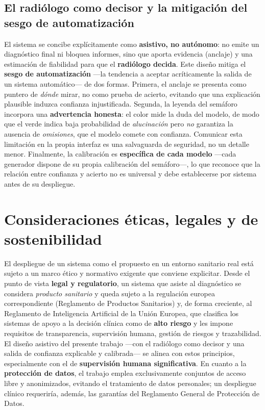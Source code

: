 \subsection{El radiólogo como decisor y la mitigación del sesgo de automatización}
El sistema se concibe explícitamente como \textbf{asistivo, no autónomo}: no emite un diagnóstico
final ni bloquea informes, sino que aporta evidencia (anclaje) y una estimación de fiabilidad para que
el \textbf{radiólogo decida}. Este diseño mitiga el \textbf{sesgo de automatización} —la tendencia a
aceptar acríticamente la salida de un sistema automático— de dos formas. Primera, el anclaje se
presenta como puntero de \emph{dónde} mirar, no como prueba de acierto, evitando que una explicación
plausible induzca confianza injustificada. Segunda, la leyenda del semáforo incorpora una
\textbf{advertencia honesta}: el color mide la duda del modelo, de modo que el verde indica baja
probabilidad de \emph{alucinación} pero \emph{no} garantiza la ausencia de \emph{omisiones}, que el
modelo comete con confianza. Comunicar esta limitación en la propia interfaz es una salvaguarda de
seguridad, no un detalle menor. Finalmente, la calibración es \textbf{específica de cada modelo}
—cada generador dispone de su propia calibración del semáforo—, lo que reconoce que la relación entre
confianza y acierto no es universal y debe establecerse por sistema antes de su despliegue.

\section{Consideraciones éticas, legales y de sostenibilidad}
El despliegue de un sistema como el propuesto en un entorno sanitario real está sujeto a un marco
ético y normativo exigente que conviene explicitar. Desde el punto de vista \textbf{legal y
regulatorio}, un sistema que asiste al diagnóstico se considera \emph{producto sanitario} y queda
sujeto a la regulación europea correspondiente (Reglamento de Productos Sanitarios) y, de forma
creciente, al Reglamento de Inteligencia Artificial de la Unión Europea, que clasifica los sistemas de
apoyo a la decisión clínica como de \textbf{alto riesgo} y les impone requisitos de transparencia,
supervisión humana, gestión de riesgos y trazabilidad. El diseño asistivo del presente trabajo —con el
radiólogo como decisor y una salida de confianza explicable y calibrada— se alinea con estos
principios, especialmente con el de \textbf{supervisión humana significativa}. En cuanto a la
\textbf{protección de datos}, el trabajo emplea exclusivamente conjuntos de acceso libre y
anonimizados, evitando el tratamiento de datos personales; un despliegue clínico requeriría, además,
las garantías del Reglamento General de Protección de Datos.

